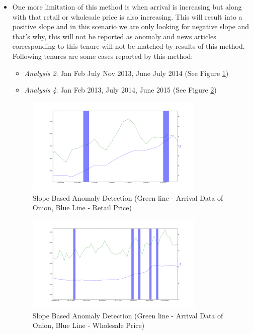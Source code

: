 \documentclass[a4paper,10pt]{report}
\begin{document}
\begin{itemize}
			\item One more limitation of this method is when arrival is increasing but along with that retail or wholesale price is also increasing. This will result into a positive slope and in this scenario we are only looking for negative slope and that's why, this will not be reported as anomaly and news articles corresponding to this tenure will not be matched by results of this method.\\		
			
			Following tenures are some cases reported by this method:
			\begin{itemize}
				\item \textit{Analysis 2}: Jan Feb July Nov 2013, June July 2014 (See Figure \ref{fig:12123})
				\item \textit{Analysis 4}: Jan Feb 2013, July 2014, June 2015 (See Figure \ref{fig:12143})
			\end{itemize}
			
			\begin{figure}[H]
		    	\centering
  		    	\includegraphics[width=0.8\textwidth]{graphs/12123.png}
		    	\caption{Slope Based Anomaly Detection (Green line - Arrival Data of Onion, Blue Line - Retail Price)}
		    	\label{fig:12123}
			\end{figure}
			
			\begin{figure}[H]
		    	\centering
  		    	\includegraphics[width=0.8\textwidth]{graphs/12143.png}
		    	\caption{Slope Based Anomaly Detection (Green line - Arrival Data of Onion, Blue Line - Wholesale Price)}
		    	\label{fig:12143}
			\end{figure}
			

\end{itemize}
\end{document}
